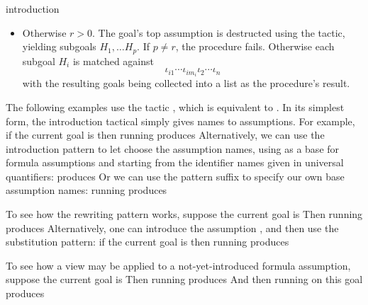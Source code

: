 \begin{tactic}[$\tau$=>$\;\iota_1 \cdots \iota_n$]{introduction}
\begin{tsyntax}[empty]{}
\begin{itemize}
\begin{itemize}
      \item Otherwise $r>0$. The goal's top assumption is destructed
        using the  tactic, yielding subgoals
        $H_1,\ldots H_p$.  If $p\neq r$, the procedure fails. Otherwise
        each subgoal $H_i$ is matched against
        \begin{displaymath}
          \iota_{i1}\cdots\iota_{i{m_i}}\iota_2\cdots \iota_n
        \end{displaymath}
        with the resulting goals being collected into a list as
        the procedure's result.
      \end{itemize}
    \end{itemize}

    The following examples use the tactic , which is
    equivalent to .
    In its simplest form, the introduction tactical simply gives names
    to assumptions.  For example, if the current goal is
    then running
    produces
    Alternatively, we can use the introduction pattern 
    to let \EasyCrypt choose the assumption names, using
     as a base for formula assumptions and starting
    from the identifier names given in universal quantifiers:
    produces
    Or we can use the \ec{!} pattern suffix to specify our
    own base assumption names: running
    produces

    To see how the \ec{->} rewriting pattern works, suppose
    the current goal is
    Then running
    produces
    Alternatively, one can introduce the assumption ,
    and then use the \ec{->>} substitution pattern:
    if the current goal is
    then running
    produces

    To see how a view may be applied to a not-yet-introduced formula
    assumption, suppose the current goal is
    Then running
    produces
    And then running
    on this goal produces


\end{tsyntax}
\end{tactic}
